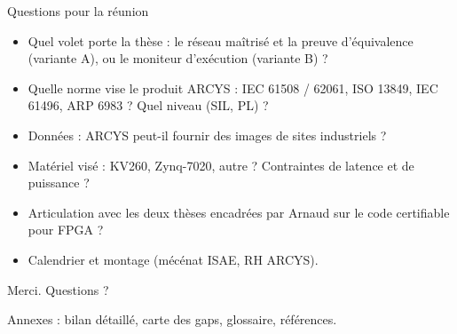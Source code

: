 \documentclass[aspectratio=169,11pt]{beamer}
\begin{document}
\begin{frame}{Questions pour la réunion}
  \begin{itemize}
    \item Quel volet porte la thèse : le réseau maîtrisé et la preuve d'équivalence
          (variante A), ou le moniteur d'exécution (variante B) ?
    \item Quelle norme vise le produit ARCYS : IEC 61508 / 62061, ISO 13849, IEC 61496,
          ARP 6983 ? Quel niveau (SIL, PL) ?
    \item Données : ARCYS peut-il fournir des images de sites industriels ?
    \item Matériel visé : KV260, Zynq-7020, autre ? Contraintes de latence et de puissance ?
    \item Articulation avec les deux thèses encadrées par Arnaud sur le code certifiable
          pour FPGA ?
    \item Calendrier et montage (mécénat ISAE, RH ARCYS).
  \end{itemize}
\end{frame}

{
\begin{frame}[plain]
  \centering\Large\color{white}
  Merci. Questions ?

  \vspace{1em}
  \small Annexes : bilan détaillé, carte des gaps, glossaire, références.
\end{frame}}

\appendix
\end{document}
